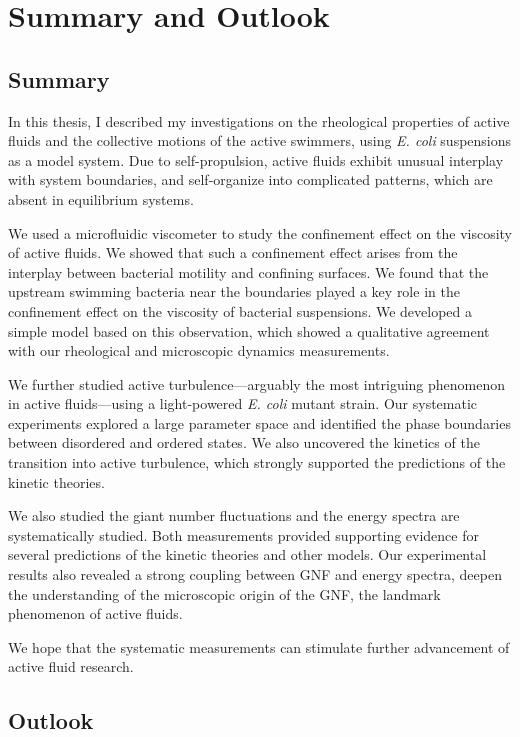 \chapter{Summary and Outlook}
\label{summary-and-outlook}
\section{Summary}

In this thesis, I described my investigations on the rheological properties of active fluids and the collective motions of the active swimmers, using \textit{E. coli} suspensions as a model system. Due to self-propulsion, active fluids exhibit unusual interplay with system boundaries, and self-organize into complicated patterns, which are absent in equilibrium systems.

We used a microfluidic viscometer to study the confinement effect on the viscosity of active fluids. We showed that such a confinement effect arises from the interplay between bacterial motility and confining surfaces. We found that the upstream swimming bacteria near the boundaries played a key role in the confinement effect on the viscosity of bacterial suspensions. We developed a simple model based on this observation, which showed a qualitative agreement with our rheological and microscopic dynamics measurements.

We further studied active turbulence---arguably the most intriguing phenomenon in active fluids---using a light-powered \textit{E. coli} mutant strain. Our systematic experiments explored a large parameter space and identified the phase boundaries between disordered and ordered states. We also uncovered the kinetics of the transition into active turbulence, which strongly supported the predictions of the kinetic theories.

We also studied the giant number fluctuations and the energy spectra are systematically studied. Both measurements provided supporting evidence for several  predictions of the kinetic theories and other models. Our experimental results also revealed a strong coupling between GNF and energy spectra, deepen the understanding of the microscopic origin of the GNF, the landmark phenomenon of active fluids.

We hope that the systematic measurements can stimulate further advancement of active fluid research.

\section{Outlook}

